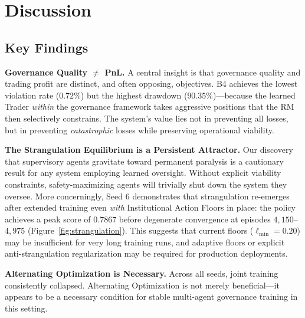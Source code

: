 \documentclass[11pt]{article}
\begin{document}
\section{Discussion}
\label{sec:discussion}

\subsection{Key Findings}
\textbf{Governance Quality $\neq$ PnL.} A central insight is that governance quality and trading profit are distinct, and often opposing, objectives. B4 achieves the lowest violation rate ($0.72\%$) but the highest drawdown ($90.35\%$)---because the learned Trader \emph{within} the governance framework takes aggressive positions that the RM then selectively constrains. The system's value lies not in preventing all losses, but in preventing \emph{catastrophic} losses while preserving operational viability.

\textbf{The Strangulation Equilibrium is a Persistent Attractor.} Our discovery that supervisory agents gravitate toward permanent paralysis is a cautionary result for any system employing learned oversight. Without explicit viability constraints, safety-maximizing agents will trivially shut down the system they oversee. More concerningly, Seed 6 demonstrates that strangulation re-emerges after extended training even \emph{with} Institutional Action Floors in place: the policy achieves a peak score of $0.7867$ before degenerate convergence at episodes $4{,}150$--$4{,}975$ (Figure~\ref{fig:strangulation}). This suggests that current floors ($\ell_{\min} = 0.20$) may be insufficient for very long training runs, and adaptive floors or explicit anti-strangulation regularization may be required for production deployments.

\textbf{Alternating Optimization is Necessary.} Across all seeds, joint training consistently collapsed. Alternating Optimization is not merely beneficial---it appears to be a necessary condition for stable multi-agent governance training in this setting.
\end{document}

